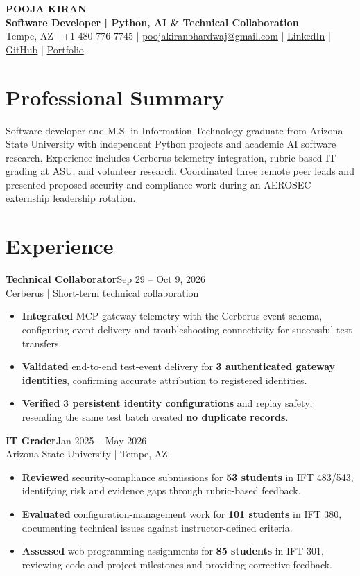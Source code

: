 \documentclass[letterpaper,10pt]{article}
\newcommand{\job}[3]{\noindent\textbf{#1}\hfill{\fontsize{10}{12}\selectfont #2}\\{\fontsize{10}{12}\selectfont #3}\vspace{1.5pt}}
\begin{document}
\fontsize{10.2}{12.0}\selectfont
\begin{center}
{\fontsize{19}{22}\selectfont\textbf{POOJA KIRAN}}\\[1pt]
{\fontsize{10.8}{12.8}\selectfont\textbf{Software Developer | Python, AI \& Technical Collaboration}}\\[2pt]
{\fontsize{10}{12}\selectfont Tempe, AZ | +1 480-776-7745 | \href{mailto:poojakiranbhardwaj@gmail.com}{poojakiranbhardwaj@gmail.com} | \href{https://www.linkedin.com/in/poojakiran}{LinkedIn} | \href{https://github.com/poojakira}{GitHub} | \href{https://poojakira.github.io/Pooja_Kiran_Portfolio_Website/}{Portfolio}}
\end{center}\vspace{-2pt}

\section{Professional Summary}
Software developer and M.S. in Information Technology graduate from Arizona State University with independent Python projects and academic AI software research. Experience includes Cerberus telemetry integration, rubric-based IT grading at ASU, and volunteer research. Coordinated three remote peer leads and presented proposed security and compliance work during an AEROSEC externship leadership rotation.

\section{Experience}
\job{Technical Collaborator}{Sep 29 -- Oct 9, 2026}{Cerberus | Short-term technical collaboration}
\begin{itemize}
\item \textbf{Integrated} MCP gateway telemetry with the Cerberus event schema, configuring event delivery and troubleshooting connectivity for successful test transfers.
\item \textbf{Validated} end-to-end test-event delivery for \textbf{3 authenticated gateway identities}, confirming accurate attribution to registered identities.
\item \textbf{Verified} \textbf{3 persistent identity configurations} and replay safety; resending the same test batch created \textbf{no duplicate records}.
\end{itemize}

\job{IT Grader}{Jan 2025 -- May 2026}{Arizona State University | Tempe, AZ}
\begin{itemize}
\item \textbf{Reviewed} security-compliance submissions for \textbf{53 students} in IFT 483/543, identifying risk and evidence gaps through rubric-based feedback.
\item \textbf{Evaluated} configuration-management work for \textbf{101 students} in IFT 380, documenting technical issues against instructor-defined criteria.
\item \textbf{Assessed} web-programming assignments for \textbf{85 students} in IFT 301, reviewing code and project milestones and providing corrective feedback.
\end{itemize}
\end{document}
